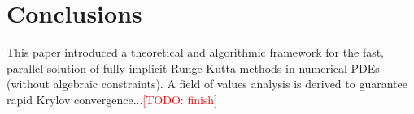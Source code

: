 \documentclass[review]{siamart}
\makeatletter
\newcommand{\todo}[1]{\textcolor{red}{[TODO\@: #1]}}
\makeatother
\begin{document}
\section{Conclusions}\label{sec:conc}

This paper introduced a theoretical and algorithmic framework for the fast, parallel
solution of fully implicit Runge-Kutta methods in numerical PDEs (without algebraic
constraints). A field of values analysis is derived to guarantee rapid Krylov
convergence...\todo{finish}



\end{document}
